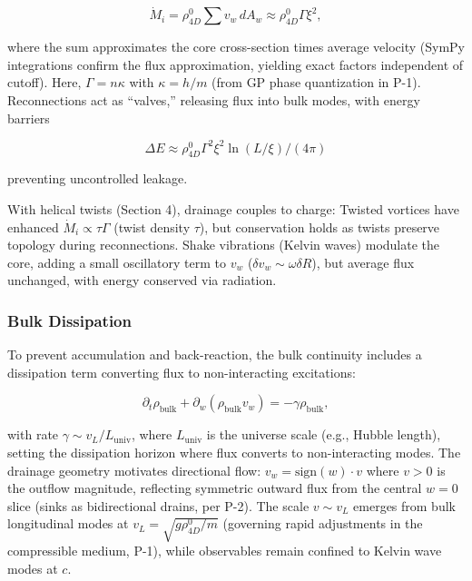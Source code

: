 \begin{equation}
\dot{M}_i = \rho_{4D}^0 \sum v_w \, dA_w \approx \rho_{4D}^0 \Gamma \xi^2,
\end{equation}

where the sum approximates the core cross-section times average velocity (SymPy integrations confirm the flux approximation, yielding exact factors independent of cutoff). Here, $\Gamma = n \kappa$ with $\kappa = h / m$ (from GP phase quantization in P-1). Reconnections act as ``valves,'' releasing flux into bulk modes, with energy barriers

\begin{equation}
\Delta E \approx \rho_{4D}^0 \Gamma^2 \xi^2 \ln(L / \xi) / (4\pi)
\end{equation}

preventing uncontrolled leakage.

With helical twists (Section 4), drainage couples to charge: Twisted vortices have enhanced $\dot{M}_i \propto \tau \Gamma$ (twist density $\tau$), but conservation holds as twists preserve topology during reconnections. Shake vibrations (Kelvin waves) modulate the core, adding a small oscillatory term to $v_w$ ($\delta v_w \sim \omega \delta R$), but average flux unchanged, with energy conserved via radiation.

\subsubsection{Bulk Dissipation}
To prevent accumulation and back-reaction, the bulk continuity includes a dissipation term converting flux to non-interacting excitations:

\begin{equation}
\partial_t \rho_{\text{bulk}} + \partial_w (\rho_{\text{bulk}} v_w) = -\gamma \rho_{\text{bulk}},
\end{equation}

with rate $\gamma \sim v_L / L_{\text{univ}}$, where $L_{\text{univ}}$ is the universe scale (e.g., Hubble length), setting the dissipation horizon where flux converts to non-interacting modes. The drainage geometry motivates directional flow: $v_w = \text{sign}(w) \cdot v$ where $v > 0$ is the outflow magnitude, reflecting symmetric outward flux from the central $w=0$ slice (sinks as bidirectional drains, per P-2). The scale $v \sim v_L$ emerges from bulk longitudinal modes at $v_L = \sqrt{g \rho_{4D}^0 / m}$ (governing rapid adjustments in the compressible medium, P-1), while observables remain confined to Kelvin wave modes at $c$.

